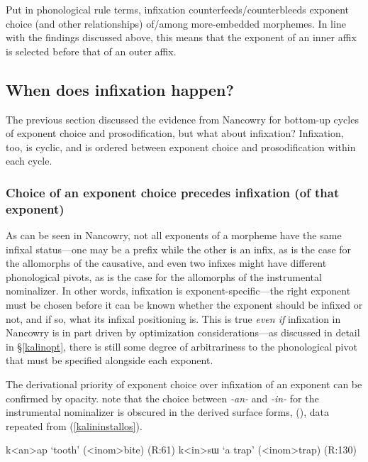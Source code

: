 \documentclass[output=paper,colorlinks,citecolor=brown,
]{langscibook}
\newcounter{nexttmp}    %
\newcommand{\Next}{\setcounter{nexttmp}{\value{equation}}\stepcounter{nexttmp}(\thenexttmp)\xspace}
\begin{document}
Put in phonological rule terms, infixation counterfeeds/counterbleeds exponent choice (and other relationships) of/among more-embedded morphemes. In line with the findings discussed above, this means that the exponent of an inner affix is selected before that of an outer affix.

\subsection{When does infixation happen?}

The previous section discussed the evidence from Nancowry for bottom-up cycles of exponent choice and prosodification, but what about infixation? Infixation, too, is cyclic, and is ordered between exponent choice and prosodification within each cycle.

\subsubsection{Choice of an exponent choice precedes infixation (of that exponent)}

As can be seen in Nancowry, not all exponents of a morpheme have the same infixal status---one may be a prefix while the other is an infix, as is the case for the allomorphs of the causative, and even two infixes might have different phonological pivots, as is the case for the allomorphs of the instrumental nominalizer. In other words, infixation is exponent-specific---the right exponent must be chosen before it can be known whether the exponent should be infixed or not, and if so, what its infixal positioning is. This is true {\it even if} infixation in Nancowry is in part driven by optimization considerations---as discussed in detail in \S\ref{kalinopt}, there is still some degree of  arbitrariness to the phonological pivot that must be specified alongside each exponent.

The derivational priority of exponent choice over infixation of an exponent can be confirmed by opacity. \citet{KalinRolle21} note that the choice between \textit{-an-} and \textit{-in-} for the instrumental nominalizer is obscured in the derived surface forms, \Next, data repeated from (\ref{kalininstallos}).

\ea 
\ea k<an>ap `tooth' (<{\sc inom}>bite) \hfill (R:61)\label{kalin18a}
\ex  k<in>sɯ `a trap' (<{\sc inom}>trap) \hfill (R:130)\label{kalin18b}
\z
\z
\end{document}
